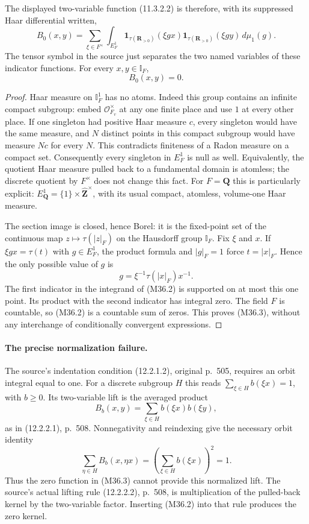 The displayed two-variable function (11.3.2.2) is
therefore, with its suppressed Haar differential written,
\[
 B_0(x,y)=\sum_{\xi\in F^\times}\int_{E_F^1}
    \mathbf1_{\tau(\mathbf R_{>0})}(\xi gx)
    \mathbf1_{\tau(\mathbf R_{>0})}(\xi gy)\,d\mu_1(g).
 \tag{M36.2}
\]
The tensor symbol in the source just separates the two
named variables of these indicator functions.
For every $x,y\in\mathbb I_F$,
\[
                              B_0(x,y)=0.
 \tag{M36.3}
\]

\begin{proof}
Haar measure on $\mathbb I_F^1$ has no atoms.
Indeed this group contains an infinite compact subgroup:
embed $\mathcal O_{F_v}^\times$ at any one finite place
and use $1$ at every other place.  If one singleton had
positive Haar measure $c$, every singleton would have
the same measure, and $N$ distinct points in this compact
subgroup would have measure $Nc$ for every $N$.
This contradicts finiteness of a Radon measure on a
compact set.  Consequently every singleton in $E_F^1$
is null as well.  Equivalently, the quotient Haar
measure pulled back to a fundamental domain is atomless;
the discrete quotient by $F^\times$ does not change this
fact.  For $F=\mathbf Q$ this is particularly explicit:
$E_{\mathbf Q}^1=\{1\}\times\widehat{\mathbf Z}^\times$,
with its usual compact, atomless, volume-one Haar measure.

The section image is closed, hence Borel: it is the
fixed-point set of the continuous map
$z\mapsto\tau(|z|_F)$ on the Hausdorff group
$\mathbb I_F$.  Fix $\xi$ and $x$.  If
$\xi gx=\tau(t)$ with $g\in E_F^1$, the product formula
and $|g|_F=1$ force $t=|x|_F$.  Hence the only possible
value of $g$ is
\[
                       g=\xi^{-1}\tau(|x|_F)x^{-1}.
 \tag{M36.4}
\]
The first indicator in the integrand of (M36.2) is
supported on at most this one point.  Its product with
the second indicator has integral zero.  The field
$F$ is countable, so (M36.2) is a countable sum of zeros.
This proves (M36.3), without any interchange of
conditionally convergent expressions.
\end{proof}

\paragraph{The precise normalization failure.}
The source's indentation condition (12.2.1.2), original
p.~505, requires an orbit integral equal to one.
For a discrete subgroup $H$ this reads
$\sum_{\xi\in H}b(\xi x)=1$, with $b\ge0$.
Its two-variable lift is the averaged product
\[
                    B_b(x,y)=\sum_{\xi\in H}b(\xi x)b(\xi y),
 \tag{M36.5}
\]
as in (12.2.2.1), p.~508.  Nonnegativity and reindexing
give the necessary orbit identity
\[
 \sum_{\eta\in H}B_b(x,\eta x)
    =\left(\sum_{\xi\in H}b(\xi x)\right)^2=1.
 \tag{M36.6}
\]
Thus the zero function in (M36.3) cannot provide this
normalized lift.  The source's actual lifting rule
(12.2.2.2), p.~508, is multiplication of the pulled-back
kernel by the two-variable factor.  Inserting (M36.2)
into that rule produces the zero kernel.

